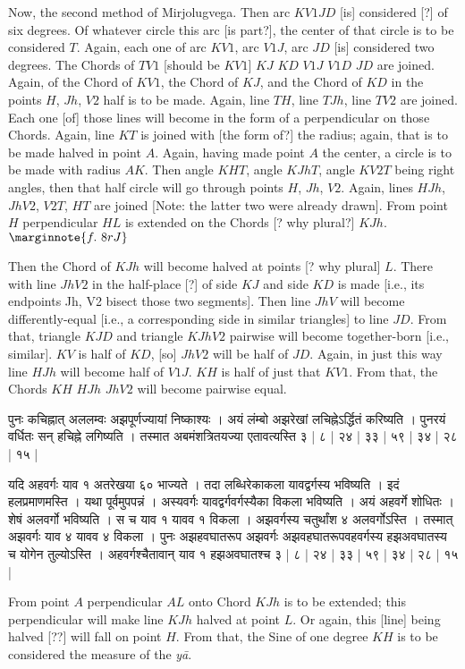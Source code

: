 \documentclass[11pt,a5paper]{book}
\def\ya{\textit{y\=a}}
\begin{document}
{\newpage
Now, the second method of Mirjolugvega. Then arc $KV1JD$ [is] considered [?] of six degrees.
Of whatever circle this arc [is part?], the center of that circle is to be considered $T$. Again, 
each one of arc $KV1$, arc $V1J$, arc $JD$ [is] considered two degrees. The Chords
of $TV1$ [should be $KV1$] $KJ$ $KD$ $V1J$ $V1D$ $JD$ are joined. Again, of the Chord of $KV1$,
the Chord of $KJ$, and the Chord of $KD$ in the points $H$, $Jh$, $V2$ half  is to be made.
Again, line $TH$, line $TJh$, line $TV2$ are  joined. Each one [of] those lines 
will become in the form of a perpendicular on those Chords. 
Again, line $KT$ is joined with [the form of?] the radius; again, that is to be made halved
in point $A$. Again, having made point $A$ the center, a circle is to be made with
radius $AK$. Then angle $KHT$, angle $KJhT$, angle $KV2T$ being right angles, 
then  that half circle will go through points $H$, $Jh$, $V2$. 
Again, lines $HJh$, $JhV2$, $V2T$, $HT$ are joined [Note: the latter two were already
drawn]. From 
point $H$ perpendicular $HL$ is extended on the Chords [? why plural?] $KJh$. 
$\marginnote{f.~8r J}$

Then the Chord of $KJh$ will become halved at points [? why plural] $L$. There with line $JhV2$ 
in the half-place [?] of side $KJ$ and side $KD$ is made [i.e., its endpoints Jh, V2 bisect those 
two segments]. Then line $JhV$ will
become differently-equal [i.e., a corresponding side in similar triangles]
to line $JD$. From that, triangle $KJD$ and triangle
$KJhV2$ pairwise will become together-born [i.e., similar]. 
$KV$ is half of $KD$, [so] $JhV2$ will be half of $JD$.
Again, in just this way line $HJh$ will become half of $V1 J$. $KH$ is half of just that $KV1$.
From that, the Chords $KH$ $HJh$ $JhV2$ will become pairwise equal. 
\newpage
{\s पुनः कचिह्नात् अललम्वः अझपूर्णज्यायां निष्काश्यः । अयं लंम्बो अझरेखां लचिह्नेऽर्द्धितं करिष्यति । 
पुनरयं वर्धितः सन् हचिह्ने लगिष्यति । तस्मात अबमंशत्रितयज्या एतावत्यस्ति ३ | ८ | २४ | ३३ | ५९ | ३४ | २८ | १५ | 

यदि अहवर्गः याव १ अतरेखया ६० भाज्यते । तदा लब्धिरेकाकला यावद्वर्गस्य भविष्यति । इदं हलप्रमाणमस्ति । 
यथा पूर्वमुपपन्नं । अस्यवर्गः यावद्वर्गवर्गस्यैका  
विकला भविष्यति । अयं अहवर्गे शोधितः । शेषं अलवर्गो भविष्यति । स च याव १ यावव १ विकला । अझवर्गस्य चतुर्थांश ४ 
अलवर्गोऽस्ति । तस्मात् अझवर्गः याव ४ यावव ४ विकला । पुनः अझहवघातरूप
अझवर्गः अझवहघातरूपवहवर्गस्य हझअवघातस्य च योगेन तुल्योऽस्ति ।
अहवर्गश्चैतावान् याव १ हझअवघातश्च ३ | ८ | २४ | ३३ | ५९ | ३४ | २८ | १५ |}  
\newpage
From point $A$ perpendicular $AL$ onto Chord $KJh$ is to be extended; this perpendicular 
will make line $KJh$ halved at point $L$. Or again, this [line] being halved [??] will fall on point $H$.
From that, the Sine of one degree $KH$ is to be considered the measure of the \ya. 

}
\end{document}
